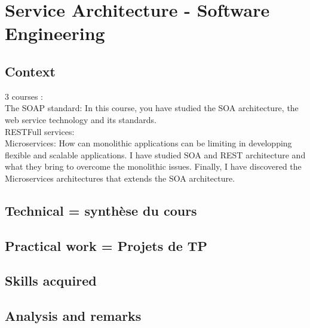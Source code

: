 \section{Service Architecture - Software Engineering}
\subsection{Context}
3 courses : \\
The SOAP standard: In this course, you have studied the SOA architecture, the web service technology and its standards. \\
RESTFull services: \\
Microservices: How can monolithic applications can be limiting in developping flexible and scalable applications. I have studied SOA and REST architecture and what they bring to overcome the monolithic issues. Finally, I have discovered the Microservices architectures that extends the SOA architecture.
\subsection{Technical = synthèse du cours}
\subsection{Practical work = Projets de TP}
\subsection{Skills acquired}
\subsection{Analysis and remarks}